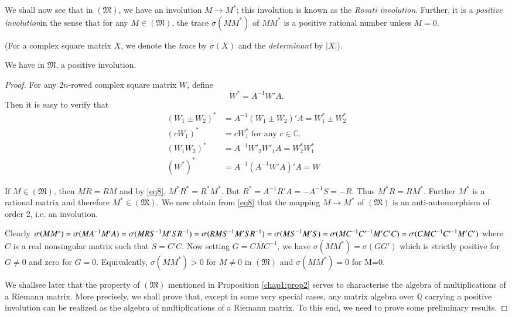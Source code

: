 We shall now see that in $(\mathfrak{M})$, we have an involution $M
\rightarrow M^{\ast}$; this involution is known as the {\em Rosati
  involution}. Further, it is a {\em positive
  involution}\pageoriginale in the sense that for any $M
\in(\mathfrak{M})$, the trace $\sigma(M M^{\ast})$ of $M M^{\ast}$ is
a positive rational number unless $M=0$.

(For a complex square matrix $X$, we denote the {\em trace} by
$\sigma(X)$ and the {\em determinant} by $|X|$).

\begin{proposition}\label{chap1:prop2}
We have in $\mathfrak{M}$, a positive involution.
\end{proposition}

\begin{proof}
For any $2n$-rowed complex square matrix $W$, define
$$
W^{\ast} = A^{-1} W' A.
$$
Then it is easy to verify that
\begin{align*}
(W_1\pm W_2)^{\ast} & = A^{-1} (W_1 \pm W_2)' A = W^{\ast}_1 \pm
  W^{\ast}_2\\
(cW_1)^{\ast} & = c W^{\ast}_1 \text{ for any } c \in
  \mathbb{C}. \tag{8}\label{eq8}\\
(W_1 W_2)^{\ast} & = A^{-1} W'_2 W'_1 A = W^{\ast}_2 W^{\ast}_1\\
(W^{\ast})^{\ast} & = A^{-1}(A^{-1}W'A)' A=W
\end{align*}

If $M\in(\mathfrak{M})$, then $MR = RM$ and by \eqref{eq8}, $M^{\ast}
R^{\ast}=R^{\ast} M^{\ast}$. But $R^{\ast}= A^{-1} R' A = -
A^{-1}S=-R$. Thus $M^{\ast} R = R M^{\ast}$. Further $M^{\ast}$ is a
rational matrix and therefore $M^{\ast} \in (\mathfrak{M})$. We now
obtain from \eqref{eq8} that the mapping $M\rightarrow M^{\ast}$ of
$(\mathfrak{M})$ is an anti-automorphism of order 2, i.e. an
involution.

Clearly $\sigma(M M^{\ast}) = \sigma(M A^{-1} M' A)= \sigma (MRS^{-1}
M'SR^{-1}) =\break \sigma(RMS^{-1}M' S R^{-1})=\sigma(MS^{-1}M'S)= \sigma (M
C^{-1} C'^{-1} M' C' C)=\break \sigma (CMC^{-1} C'^{-1} M' C')$ where $C$ is
a real nonsingular matrix such that $S=C'C$. Now setting $G=C M
C^{-1}$, we have $\sigma(M M^{\ast}) = \sigma (G G')$ which is
strictly positive for $G\neq 0$ and zero for $G=0$. Equivalently,
$\sigma(M M^{\ast}) > 0$ for $M \neq 0$ in $(\mathfrak{M})$ and
$\sigma(M M^{\ast})=0$ for M=0.

We shall\pageoriginale see later that the property of $(\mathfrak{M})$
mentioned in Proposition \ref{chap1:prop2} serves to characterise the algebra of
multiplications of a Riemann matrix. More precisely, we shall prove
that, except in some very special cases, any matrix algebra over
$\mathbb{Q}$ carrying a positive involution can be realized as the
algebra of multiplications of a Riemann matrix. To this end, we need
to prove some preliminary results.


\end{proof}
